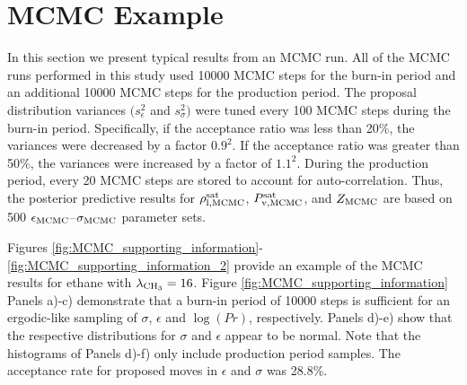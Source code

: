 \documentclass[journal=jctc,manuscript=article]{achemso}
\begin{document}
\newpage

\section{MCMC Example} \label{MCMC Example}

In this section we present typical results from an MCMC run. All of the MCMC runs performed in this study used 10000 MCMC steps for the burn-in period and an additional 10000 MCMC steps for the production period. The proposal distribution variances $(s^2_{\epsilon}$ and $s^2_{\sigma})$ were tuned every 100 MCMC steps during the burn-in period. Specifically, if the acceptance ratio was less than 20\%, the variances were decreased by a factor $0.9^2$. If the acceptance ratio was greater than 50\%, the variances were increased by a factor of $1.1^2$. During the production period, every 20 MCMC steps are stored to account for auto-correlation. Thus, the posterior predictive results for $\rho_{\rm l, MCMC}^{\rm sat}$, $P_{\rm v, MCMC}^{\rm sat}$, and $Z_{\rm MCMC}$ are based on 500 $\epsilon_{\rm MCMC}$--$\sigma_{\rm MCMC}$ parameter sets. 

Figures \ref{fig:MCMC_supporting_information}-\ref{fig:MCMC_supporting_information_2} provide an example of the MCMC results for ethane with $\lambda_{\rm CH_3} = 16$. Figure \ref{fig:MCMC_supporting_information} Panels a)-c) demonstrate that a burn-in period of 10000 steps is sufficient for an ergodic-like sampling of $\sigma$, $\epsilon$ and $\log(Pr)$, respectively. Panels d)-e) show that the respective distributions for $\sigma$ and $\epsilon$ appear to be normal. Note that the histograms of Panels d)-f) only include production period samples. The acceptance rate for proposed moves in $\epsilon$ and $\sigma$ was 28.8\%. 
\end{document}
